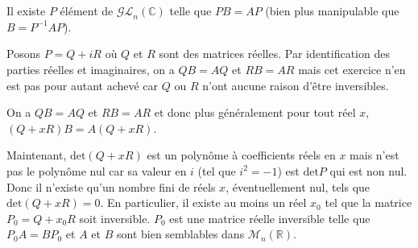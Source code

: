 \documentclass[11pt,a4paper]{article}
\newcommand{\Rr}{\mathbb{R}} \newcommand{\R}{\mathbb{R}}
\newcommand{\Cc}{\mathbb{C}} \newcommand{\C}{\mathbb{C}}
\begin{document}
Il existe $P$ élément de $\mathcal{GL}_n(\Cc)$ telle que $PB =AP$ (bien plus manipulable que $B=P^{-1}AP$).

Posons $P=Q+iR$ où $Q$ et $R$ sont des matrices réelles. 
Par identification des parties réelles et imaginaires, on a $QB=AQ$ et $RB=AR$ mais cet exercice n'en est pas pour autant achevé car $Q$ ou $R$ n'ont aucune raison d'être inversibles.

On a $QB=AQ$ et $RB= AR$ et donc plus généralement pour tout réel $x$, $(Q+xR)B=A(Q+xR)$.

Maintenant, $\text{det}(Q+xR)$ est un polynôme à coefficients réels en $x$ mais n'est pas le polynôme nul car sa valeur en $i$ (tel que $i^2 = -1$) est $\text{det}P$ qui est non nul. Donc il n'existe qu'un nombre fini de réels $x$, éventuellement nul, tels que $\text{det}(Q+xR) = 0$. En particulier, il existe au moins un réel $x_0$ tel que la matrice $P_0=Q+x_0R$ soit inversible. $P_0$ est une matrice réelle inversible telle que $P_0A=BP_0$ et $A$ et $B$ sont bien semblables dans $\mathcal{M}_n(\Rr)$.
\end{document}
